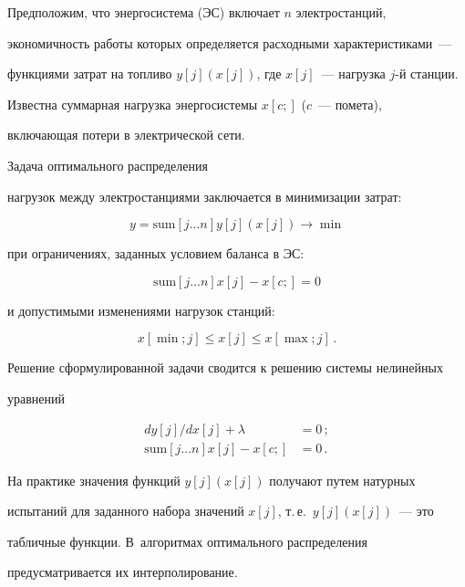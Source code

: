   Предположим, что энергосистема (ЭС) включает $n$ электростанций,


экономичность работы которых определяется расходными характеристиками~---


функциями затрат на топливо $y[j](x[j])$, где $x[j]$~--- нагрузка $j$-й станции.


Известна суммарная нагрузка энергосистемы $x[c;]$ ($c$~--- помета),


включающая потери в электрической сети.





Задача оптимального распределения


нагрузок между электростанциями заключается в минимизации затрат:


  $$


  y = \mathrm{sum} [j \ldots n] y[j](x[j]) \to \min


  $$


  при ограничениях, заданных условием баланса в ЭС:


  $$


  \mathrm{sum} [j\ldots n] x[j] - x[c;] = 0


  $$


  и допустимыми изменениями нагрузок станций:


  $$


  x[\min; j] \leq x[j] \leq x[\max; j]\,.


  $$


  Решение сформулированной задачи сводится к решению системы нелинейных


уравнений


  \begin{align*}


dy[j] / dx[j] + \lambda&= 0\,;\\[3pt]


  \mathrm{sum} [j\ldots n] x[j] - x[c;] &= 0\,.


  \end{align*}


  На практике значения функций $y[j](x[j])$ получают путем натурных


испытаний для заданного набора значений $x[j]$, т.\,е.\ $y[j](x[j])$~--- это


табличные функции. В~алгоритмах оптимального распределения


предусматривается их интерполирование.





